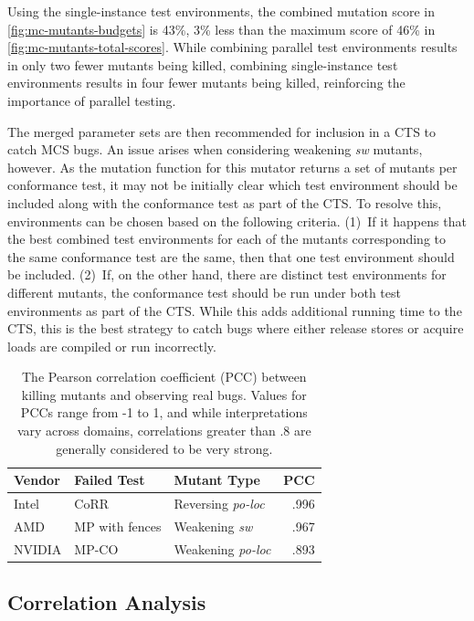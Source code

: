Using the single-instance test environments, the combined mutation score in \myfig\ref{fig:mc-mutants-budgets} is 43\%, 3\% less than the maximum score of 46\% in \myfig\ref{fig:mc-mutants-total-scores}. While combining parallel test environments results in only two fewer mutants being killed, combining single-instance test environments results in four fewer mutants being killed, reinforcing the importance of parallel testing.

The merged parameter sets are then recommended for inclusion in a CTS to catch MCS bugs. An issue arises when considering weakening \textit{sw} mutants, however. As the mutation function for this mutator returns a set of mutants per conformance test, it may not be initially clear which test environment should be included along with the conformance test as part of the CTS. To resolve this, environments can be chosen based on the following criteria. (1)~If it happens that the best combined test environments for each of the mutants corresponding to the same conformance test are the same, then that one test environment should be included. (2)~If, on the other hand, there are distinct test environments for different mutants, the conformance test should be run under both test environments as part of the CTS. While this adds additional running time to the CTS, this is the best strategy to catch bugs where either release stores or acquire loads are compiled or run incorrectly.

\begin{table}
\centering
\caption{The Pearson correlation coefficient (PCC) between killing mutants and observing real bugs. Values for PCCs range from -1 to 1, and while interpretations vary across domains, correlations greater than .8 are generally considered to be very strong.}
\begingroup
{}
\begin{tabular}{l l l r}
 \toprule
 \textbf{Vendor} & \textbf{Failed Test} & \textbf{Mutant Type} & \textbf{PCC} \\
 \midrule
 Intel & CoRR & Reversing \textit{po-loc} & .996 \\
 AMD & MP with fences & Weakening \textit{sw} & .967 \\
 NVIDIA & MP-CO & Weakening \textit{po-loc} & .893 \\
 \bottomrule
\end{tabular}
\endgroup
\label{table:mc-mutants-corr-analysis}
\end{table}

\subsection{Correlation Analysis\label{sec:mc-mutants-corr-analysis}}


